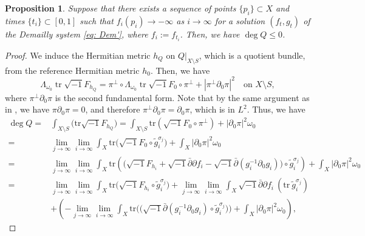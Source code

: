 \documentclass[a4, 12pt, 
]{amsart}
\numberwithin{equation}{section}
\theoremstyle{plain}
\newtheorem{prop}[equation]{Proposition}
\theoremstyle{definition}
\theoremstyle{remark}
\begin{document}
\begin{prop}\label{prop: f}
    Suppose that there exists a sequence of points $\{p_i\}\subset X$ and times $\{t_i\}\subset[0,1]$ such that $f_i(p_i)\to -\infty$ as $i\to\infty$ for a solution $(f_t,g_t)$ of the Demailly system \eqref{eq: Dem'}, where $f_i:=f_{t_i}$. Then, we have $\deg {Q}\le0$.
\end{prop}

\begin{proof}
    We induce the Hermitian metric $h_Q$ on $Q|_{X\setminus S}$, which is a quotient bundle, from the reference Hermitian metric $h_0$. 
    Then, we have 
    \begin{equation*}
        \Lambda_{\omega_0}\operatorname{tr}\sqrt{-1}F_{h_Q}= \pi^{\perp}\circ\Lambda_{\omega_0}\operatorname{tr}\sqrt{-1}F_0\circ\pi^{\perp}+|\pi^\perp\partial_0\pi|^2 \quad \text{on } X\setminus S,
    \end{equation*}
    where $\pi^\perp\partial_0\pi$ is the second fundamental form. Note that by the same argument as in \cite[equation (4.15)]{UY}, we have $\pi\partial_0\pi=0$, and therefore $\pi^\perp\partial_0\pi=\partial_0\pi$, which is in $L^2$.  
    Thus, we have
    \begin{equation}\label{eq: degQ}
    \begin{aligned}
        \deg Q
        =&\int_{X\setminus S} \big(\mathrm{tr}\sqrt{-1}F_{h_Q}\big)=\int_{X\setminus S} \mathrm{tr} \left(\sqrt{-1}F_0\circ\pi^{\perp}\right)+|\partial_0\pi|^2\omega_0\\
        =&\lim_{j\to\infty}\lim_{i\to\infty}\int_X\mathrm{tr}\Big(\sqrt{-1}F_0\circ \tilde{g}^{\sigma_j}_i\Big)+\int_X|\partial_0\pi|^2\omega_0\\
        =&\lim_{j\to\infty}\lim_{i\to\infty}\int_{X} \mathrm{tr}\left(\big(\sqrt{-1}F_{h_i}+\sqrt{-1}\bar{\partial}\partial f_i-\sqrt{-1}\bar{\partial}(g_i^{-1}\partial_0g_i)\big)\circ\tilde{g}^{\sigma_j}_i\right)+\int_X|\partial_0\pi|^2\omega_0\\
        =&\lim_{j\to\infty}\lim_{i\to\infty}\int_{X}\mathrm{tr}\big(\sqrt{-1}F_{h_i}\circ\tilde{g}^{\sigma_j}_i\big)+\lim_{j\to\infty}\lim_{i\to\infty}\int_{X}\sqrt{-1}\bar{\partial}\partial f_i\  (\mathrm{tr}\ \tilde{g}^{\sigma_j}_i)\\
        &+\left(-\lim_{j\to\infty}\lim_{i\to\infty}\int_{X}\mathrm{tr}\Big(\big(\sqrt{-1}\bar{\partial}(g_i^{-1}\partial_0g_i)\circ\tilde{g}^{\sigma_j}_i\big)\Big)+\int_X|\partial_0\pi|^2\omega_0\right),
    \end{aligned}
    \end{equation}

\end{proof}
\end{document}
